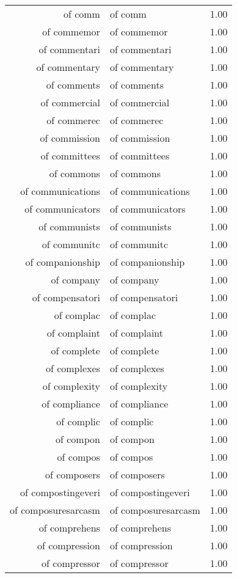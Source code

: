 \begin{table}[ht]
\begin{tabular}{rlr}
  of comm & of comm & 1.00 \\ 
  of commemor & of commemor & 1.00 \\ 
  of commentari & of commentari & 1.00 \\ 
  of commentary & of commentary & 1.00 \\ 
  of comments & of comments & 1.00 \\ 
  of commercial & of commercial & 1.00 \\ 
  of commerec & of commerec & 1.00 \\ 
  of commission & of commission & 1.00 \\ 
  of committees & of committees & 1.00 \\ 
  of commons & of commons & 1.00 \\ 
  of communications & of communications & 1.00 \\ 
  of communicators & of communicators & 1.00 \\ 
  of communists & of communists & 1.00 \\ 
  of communitc & of communitc & 1.00 \\ 
  of companionship & of companionship & 1.00 \\ 
  of company & of company & 1.00 \\ 
  of compensatori & of compensatori & 1.00 \\ 
  of complac & of complac & 1.00 \\ 
  of complaint & of complaint & 1.00 \\ 
  of complete & of complete & 1.00 \\ 
  of complexes & of complexes & 1.00 \\ 
  of complexity & of complexity & 1.00 \\ 
  of compliance & of compliance & 1.00 \\ 
  of complic & of complic & 1.00 \\ 
  of compon & of compon & 1.00 \\ 
  of compos & of compos & 1.00 \\ 
  of composers & of composers & 1.00 \\ 
  of compostingeveri & of compostingeveri & 1.00 \\ 
  of composuresarcasm & of composuresarcasm & 1.00 \\ 
  of comprehens & of comprehens & 1.00 \\ 
  of compression & of compression & 1.00 \\ 
  of compressor & of compressor & 1.00 \\ 

\end{tabular}
\end{table}
